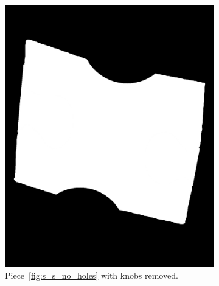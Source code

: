 \documentclass{article}
\begin{document}
\begin{figure}
\begin{subfigure}{0.3\textwidth}
    \includegraphics[width=\linewidth]{pictures/piece_with_no_knobs.png}
    \caption{Piece~\cref{fig:s_s_no_holes} with knobs removed.}
    \label{fig:s_s_no_knobs}
  \end{subfigure}
  \hfill
  \begin{subfigure}{0.3\textwidth}
    \centering

\end{subfigure}
\end{figure}
\end{document}
